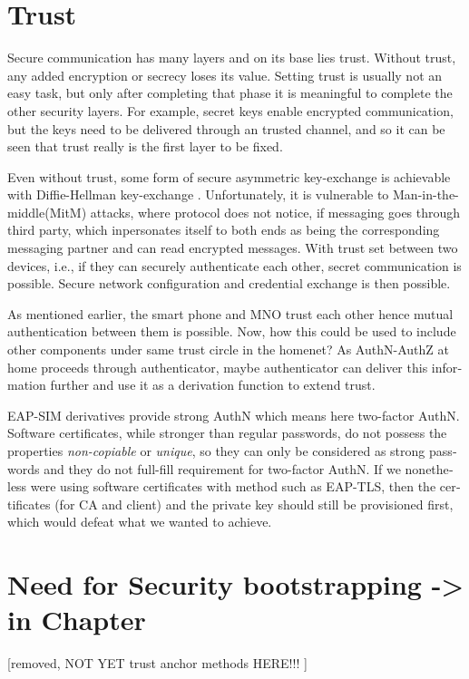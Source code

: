 \documentclass[12pt,a4paper,english]{tutthesis}
\begin{document}
\begin{otherlanguage}{english}
\section{Trust}
\label{sec-2-6}

Secure communication has many layers and on its base lies trust. Without
trust, any added encryption or secrecy loses its value. 
Setting trust is usually not an easy task, but only after
completing that phase it is meaningful to complete the other security
layers.
For example, secret keys enable encrypted communication, but the keys need to be
delivered through an trusted channel, and so it can be seen that trust
really is the first layer to be fixed. 



Even without trust, some form of secure asymmetric key-exchange is achievable
with Diffie-Hellman key-exchange \cite{diffie1976new}. Unfortunately, it is vulnerable
to Man-in-the-middle(MitM) attacks, where protocol does not notice, 
if messaging goes through third party, which inpersonates itself to 
both ends as being the corresponding messaging partner and can
read encrypted messages.
With trust set between two devices, i.e.,  if they can securely
authenticate each other, secret communication is possible. 
Secure network configuration and credential exchange is then possible.


As mentioned earlier, the smart phone and MNO trust each other hence
mutual authentication between them is possible.  Now, how this could be used
to include other components under same trust circle in the homenet? 
As AuthN-AuthZ at home proceeds through authenticator, maybe
authenticator  can deliver this information further and use it as a
 derivation function to extend trust.

EAP-SIM derivatives provide strong AuthN which means here two-factor
AuthN. Software certificates, while stronger than regular passwords,
do not possess the properties \emph{non-copiable} or \emph{unique}, so they can only
be considered as strong passwords and they do not full-fill 
requirement for two-factor AuthN.
If we nonetheless were using software certificates with method such as
EAP-TLS, then the certificates (for CA and client) and the private key
should still be provisioned first, which would defeat what we wanted
to achieve.


\section{Need for Security bootstrapping -> in Chapter}
\label{sec-2-7}
[removed, NOT YET trust anchor methods HERE!!! ]




\end{otherlanguage}
\end{document}
